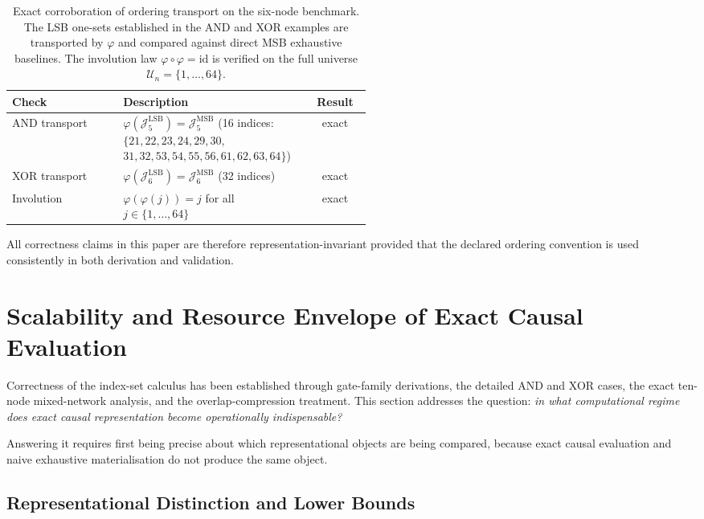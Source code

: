 \documentclass[11pt]{article}
\theoremstyle{definition}
\newcommand{\U}{\mathcal{U}_n}
\newcommand{\J}{\mathcal{J}}
\begin{document}
\begin{table}[t]
\centering
\small
\begin{tabular}{@{}lp{0.52\linewidth}c@{}}
\toprule
\textbf{Check} & \textbf{Description} & \textbf{Result} \\
\midrule
AND transport &
  \(\varphi(\J_5^{\mathrm{LSB}})=\J_5^{\mathrm{MSB}}\) (16 indices:
  \(\{21,22,23,24,29,30,\) \(31,32,53,54,55,56,61,62,63,64\}\)) & exact \\[2pt]
XOR transport &
  \(\varphi(\J_6^{\mathrm{LSB}})=\J_6^{\mathrm{MSB}}\) (32 indices) & exact \\
Involution &
  \(\varphi(\varphi(j))=j\) for all \(j\in\{1,\dots,64\}\) & exact \\
\bottomrule
\end{tabular}
\caption{Exact corroboration of ordering transport on the six-node benchmark. The LSB one-sets established in the AND and XOR examples are transported by \(\varphi\) and compared against direct MSB exhaustive baselines. The involution law \(\varphi\circ\varphi=\mathrm{id}\) is verified on the full universe \(\U=\{1,\dots,64\}\).}
\label{lst:ordering-invariance-session}
\end{table}

All correctness claims in this paper are therefore representation-invariant provided that the declared ordering convention is used consistently in both derivation and validation.

\section{Scalability and Resource Envelope of Exact Causal Evaluation}\label{sec:scalability}
Correctness of the index-set calculus has been established through gate-family derivations, the
detailed AND and XOR cases, the exact ten-node mixed-network analysis, and the overlap-compression
treatment. This section addresses the question: \emph{in what computational regime does exact causal
representation become operationally indispensable?}

Answering it requires first being precise about which representational objects are being compared,
because exact causal evaluation and naive exhaustive materialisation do not produce the same object.

\subsection{Representational Distinction and Lower Bounds}
\end{document}
